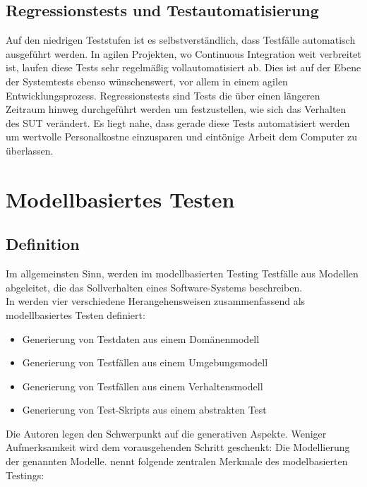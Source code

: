 \subsection{Regressionstests und Testautomatisierung}
Auf den niedrigen Teststufen ist es selbstverständlich, dass Testfälle automatisch ausgeführt werden. In agilen Projekten, wo Continuous Integration weit verbreitet ist, laufen diese Tests sehr regelmäßig vollautomatisiert ab. Dies ist auf der Ebene der Systemtests ebenso wünschenswert, vor allem in einem agilen Entwicklungsprozess\cite{linz_testing_2014}. Regressionstests sind Tests die über einen längeren Zeitraum hinweg durchgeführt werden um festzustellen, wie sich das Verhalten des SUT verändert. Es liegt nahe, dass gerade diese Tests automatisiert werden um wertvolle Personalkostne einzusparen und eintönige Arbeit dem Computer zu überlassen.




\section{Modellbasiertes Testen}
\label{sec:mbt}
\subsection{Definition}
Im allgemeinsten Sinn, werden im modellbasierten Testing Testfälle aus Modellen abgeleitet, die das Sollverhalten eines Software-Systems beschreiben. \cite{sensler_testautomatisierung_2011}\\

In \cite{utting_practical_2007} werden vier verschiedene Herangehensweisen zusammenfassend als modellbasiertes Testen definiert:

\begin{itemize}
\item Generierung von Testdaten aus einem Domänenmodell
\item Generierung von Testfällen aus einem Umgebungsmodell
\item Generierung von Testfällen aus einem Verhaltensmodell
\item Generierung von Test-Skripts aus einem abstrakten Test
\end{itemize}

Die Autoren legen den Schwerpunkt auf die generativen Aspekte. Weniger Aufmerksamkeit wird dem vorausgehenden Schritt geschenkt: Die Modellierung der genannten Modelle. \cite{rossner_basiswissen_2010} nennt folgende  zentralen Merkmale des modelbasierten Testings:

